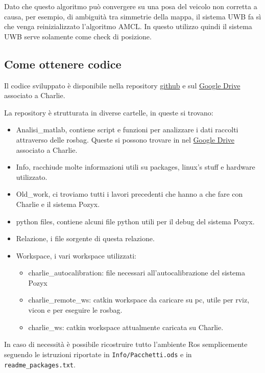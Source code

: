 Dato che questo algoritmo può convergere su una posa del veicolo non corretta a causa, per esempio, di ambiguità  tra simmetrie della mappa, 
il sistema UWB fa sì che venga reinizializzato l'algoritmo AMCL. 
In questo utilizzo quindi il sistema UWB serve solamente come check di posizione.

\subsection*{Come ottenere codice}
Il codice sviluppato è disponibile nella repository \href{https://github.com/ABiondi12/project_sgn}{github} e sul
\href{https://drive.google.com/drive/folders/1rXppVs0qSfeEKQumRFrPhkpiYDCvTXOL?usp=sharing}{Google Drive} associato a Charlie. 

La repository \`e strutturata in diverse cartelle, in queste si trovano:
\begin{itemize}
	\item Analisi\_matlab, contiene script e funzioni per analizzare i dati raccolti attraverso delle rosbag. Queste si possono trovare in nel
	\href{https://drive.google.com/drive/folders/1rXppVs0qSfeEKQumRFrPhkpiYDCvTXOL?usp=sharing}{Google Drive} associato a Charlie. 
	
	\item Info, racchiude molte informazioni utili su packages, linux's stuff e hardware utilizzato.

	\item Old\_work, ci troviamo tutti i lavori precedenti che hanno a che fare con Charlie e il sistema Pozyx. 

	\item python files, contiene alcuni file python utili per il debug del sistema Pozyx.

	\item Relazione, i file sorgente di questa relazione.
	
	\item Workspace, i vari workspace utilizzati:
		\begin{itemize}
			\item charlie\_autocalibration: file necessari all'autocalibrazione del sistema Pozyx

			\item charlie\_remote\_ws: catkin workspace da caricare su pc, utile per rviz, vicon e per eseguire le rosbag.
			
			\item charlie\_ws: catkin workspace attualmente caricata su Charlie.
			
		\end{itemize}

\end{itemize}
In caso di necessit\`a \`e possibile ricostruire tutto l'ambiente Ros semplicemente seguendo le istruzioni riportate in \verb|Info/|\verb|Pacchetti.ods| 
e in \verb|readme_packages.txt|.



